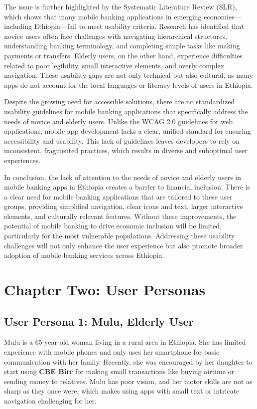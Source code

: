 \documentclass[a4paper,12pt]{report}
\begin{document}
The issue is further highlighted by the Systematic Literature Review (SLR), which shows that many mobile banking applications in emerging economies—including Ethiopia—fail to meet usability criteria. Research has identified that novice users often face challenges with navigating hierarchical structures, understanding banking terminology, and completing simple tasks like making payments or transfers. Elderly users, on the other hand, experience difficulties related to poor legibility, small interactive elements, and overly complex navigation. These usability gaps are not only technical but also cultural, as many apps do not account for the local languages or literacy levels of users in Ethiopia.

Despite the growing need for accessible solutions, there are no standardized usability guidelines for mobile banking applications that specifically address the needs of novice and elderly users. Unlike the WCAG 2.0 guidelines for web applications, mobile app development lacks a clear, unified standard for ensuring accessibility and usability. This lack of guidelines leaves developers to rely on inconsistent, fragmented practices, which results in diverse and suboptimal user experiences.

In conclusion, the lack of attention to the needs of novice and elderly users in mobile banking apps in Ethiopia creates a barrier to financial inclusion. There is a clear need for mobile banking applications that are tailored to these user groups, providing simplified navigation, clear icons and text, larger interactive elements, and culturally relevant features. Without these improvements, the potential of mobile banking to drive economic inclusion will be limited, particularly for the most vulnerable populations. Addressing these usability challenges will not only enhance the user experience but also promote broader adoption of mobile banking services across Ethiopia.

\chapter*{Chapter Two: User Personas}
\setcounter{chapter}{2}
\setcounter{section}{0}
\section{User Persona 1: Mulu, Elderly User}

Mulu is a 65-year-old woman living in a rural area in Ethiopia. She has limited experience with mobile phones and only uses her smartphone for basic communication with her family. Recently, she was encouraged by her daughter to start using \textbf{CBE Birr} for making small transactions like buying airtime or sending money to relatives. Mulu has poor vision, and her motor skills are not as sharp as they once were, which makes using apps with small text or intricate navigation challenging for her.
\end{document}
